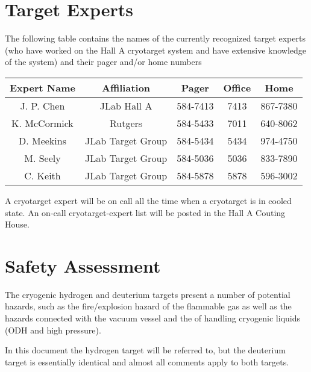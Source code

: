 \vspace{0.3cm}


\section*{Target Experts}

The following table contains the names of the currently recognized target 
experts (who have worked on the Hall A cryotarget system and
have extensive knowledge of the system)
and their pager and/or home numbers

\vspace{0.3cm}
\begin{center}
\begin{tabular}{|c|c|c|c|c|}
\hline 
Expert Name &Affiliation&
Pager&Office&
Home\\
\hline 
\hline 
\hline 
J. P. Chen&JLab Hall A&
 584-7413&
 7413&
 867-7380\\
\hline 
K. McCormick&Rutgers&
584-5433&
7011&
640-8062\\
\hline 
D. Meekins&JLab Target Group&
584-5434&
5434&
974-4750\\
\hline
M. Seely&JLab Target Group&
584-5036&
5036&
833-7890\\
\hline  
C. Keith&JLab Target Group&
584-5878&
5878&
596-3002\\
\hline 
\end{tabular}
\end{center}
\vspace{0.3cm}

\par
A cryotarget expert will be on call all the time when
a cryotarget is in cooled state.
An on-call cryotarget-expert list will be posted in the 
Hall A Couting House. 



\section{Safety Assessment}

\begin{safetyen}{10}{5}
The cryogenic hydrogen and deuterium targets present a number of potential
hazards, such as the
fire/explosion hazard of the flammable gas as well as the hazards
connected with
the vacuum vessel and the of handling cryogenic liquids
(ODH and high pressure). 
\end{safetyen}
In this document the hydrogen target will be referred
to, but the deuterium target is essentially identical and almost all
comments apply to both targets. 

